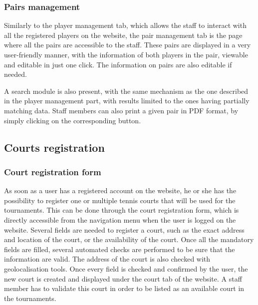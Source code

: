 \subsubsection{Pairs management}
\label{subs:Pairs management}


Similarly to the player management tab, which allows the staff to interact with
all the registered players on the website, the pair management tab is the page
where all the pairs are accessible to the staff. These pairs are displayed in a
very user-friendly manner, with the information of both players in the
pair, viewable and editable in just one click. The information on pairs are
also editable if needed. \newline

A search module is also present, with the same mechanism as the one described
in the player management part, with results limited to the ones having partially
matching data. Staff members can also print a given pair in PDF format,
by simply clicking on the corresponding button.

\subsection{Courts registration}
\label{sub:Courts registration}

\subsubsection{Court registration form}
\label{subs:Court registration form}


As soon as a user has a registered account on the website,
he or she has the possibility to register one or multiple tennis courts that
will be used for the tournaments. This can be done through the court
registration form, which is directly accessible from the navigation menu
when the user is logged on the website. Several fields are needed to register
a court, such as the exact address and location of the court, or the
availability of the court. Once all the mandatory fields are filled, several
automated checks are performed to be sure that the information are valid.
The address of the court is also checked with geolocalisation tools.
Once every field is checked and confirmed by the user, the new court is
created and displayed under the court tab of the website. A staff member
has to validate this court in order to be listed as an available court
in the tournaments.

